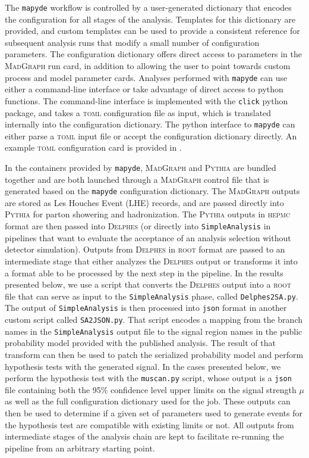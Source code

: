 \documentclass{article}
\newcommand{\mapyde}{\texttt{mapyde}}
\newcommand{\simpleanalysis}{\texttt{SimpleAnalysis}}
\newcommand{\madgraph}{\textsc{MadGraph}}
\newcommand{\pythia}{\textsc{Pythia}}
\newcommand{\delphes}{\textsc{Delphes}}
\newcommand{\hepmc}{\textsc{hepmc}}
\newcommand{\ROOT}{\textsc{root}}
\newcommand{\json}{\texttt{json}}
\newcommand{\toml}{\textsc{toml}}
\begin{document}
The \mapyde{} workflow is controlled by a user-generated dictionary that encodes the configuration for all stages of the analysis.  Templates for this dictionary are provided, and custom templates can be used to provide a consistent reference for subsequent analysis runs that modify a small number of configuration parameters.  The configuration dictionary offers direct access to parameters in the \madgraph{} run card, in addition to allowing the user to point towards custom process and model parameter cards.  Analyses performed with \mapyde{} can use either a command-line interface or take advantage of direct access to python functions.  The command-line interface is implemented with the \texttt{click} python package, and takes a \toml{} configuration file as input, which is translated internally into the configuration dictionary.  The python interface to \mapyde{} can either parse a \toml{} input file or accept the configuration dictionary directly.  An example \toml{} configuration card is provided in .

In the containers provided by \mapyde, \madgraph{} and \pythia{} are bundled together and are both launched through a \madgraph{} control file that is generated based on the \mapyde{} configuration dictionary.  The \madgraph{} outputs are stored as Les Houches Event (LHE) records, and are passed directly into \pythia{} for parton showering and hadronization.  The \pythia{} outputs in \hepmc{} format are then passed into \delphes{} (or directly into \simpleanalysis{} in pipelines that want to evaluate the acceptance of an analysis selection without detector simulation).  Outputs from \delphes{} in \ROOT{} format are passed to an intermediate stage that either analyzes the \delphes{} output or transforms it into a format able to be processed by the next step in the pipeline.  In the results presented below, we use a script that converts the \delphes{} output into a \ROOT{} file that can serve as input to the \simpleanalysis{} phase, called \texttt{Delphes2SA.py}.  The output of \simpleanalysis{} is then processed into \json{} format in another custom script called \texttt{SA2JSON.py}.  That script encodes a mapping from the branch names in the \simpleanalysis{} output file to the signal region names in the public probability model provided with the published analysis.  The result of that transform can then be used to patch the serialized probability model and perform hypothesis tests with the generated signal.  In the cases presented below, we perform the hypothesis test with the \texttt{muscan.py} script, whose output is a \json{} file containing both the 95\% confidence level upper limits on the signal strength $\mu$ as well as the full configuration dictionary used for the job.  These outputs can then be used to determine if a given set of parameters used to generate events for the hypothesis test are compatible with existing limits or not.  All outputs from intermediate stages of the analysis chain are kept to facilitate re-running the pipeline from an arbitrary starting point.
\end{document}
